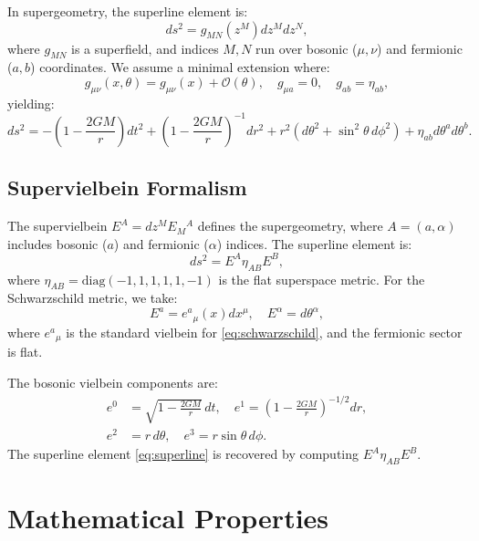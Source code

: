 \documentclass[12pt]{article}
\theoremstyle{plain}
\newcommand{\supercoords}{z^{M}}
\newcommand{\superline}{ds^{2}}
\newcommand{\schwarzschild}{g_{\mu\nu}}
\newcommand{\supervielbein}{E^{A}}
\begin{document}
In supergeometry, the superline element is:
\begin{equation}
\superline = g_{MN}(\supercoords) dz^{M} dz^{N},
\end{equation}
where $g_{MN}$ is a superfield, and indices $M, N$ run over bosonic ($\mu, \nu$) and fermionic ($a, b$) coordinates. We assume a minimal extension where:
\begin{equation}
g_{\mu\nu}(x, \theta) = \schwarzschild(x) + \mathcal{O}(\theta), \quad g_{\mu a} = 0, \quad g_{ab} = \eta_{ab},
\end{equation}
yielding:
\begin{equation}
\superline = -\left(1 - \frac{2GM}{r}\right) dt^{2} + \left(1 - \frac{2GM}{r}\right)^{-1} dr^{2} + r^{2} (d\theta^{2} + \sin^{2}\theta \, d\phi^{2}) + \eta_{ab} d\theta^{a} d\theta^{b}.
\label{eq:superline}
\end{equation}

\subsection{Supervielbein Formalism}

The supervielbein $\supervielbein = dz^{M} E_{M}{}^{A}$ defines the supergeometry, where $A = (a, \alpha)$ includes bosonic ($a$) and fermionic ($\alpha$) indices. The superline element is:
\begin{equation}
\superline = \supervielbein \eta_{AB} E^{B},
\end{equation}
where $\eta_{AB} = \mathrm{diag}(-1, 1, 1, 1, 1, -1)$ is the flat superspace metric. For the Schwarzschild metric, we take:
\begin{equation}
E^{a} = e^{a}{}_{\mu}(x) dx^{\mu}, \quad E^{\alpha} = d\theta^{\alpha},
\end{equation}
where $e^{a}{}_{\mu}$ is the standard vielbein for \eqref{eq:schwarzschild}, and the fermionic sector is flat.

The bosonic vielbein components are:
\begin{align}
e^{0} &= \sqrt{1 - \frac{2GM}{r}} \, dt, \quad e^{1} = \left(1 - \frac{2GM}{r}\right)^{-1/2} dr, \\
e^{2} &= r \, d\theta, \quad e^{3} = r \sin\theta \, d\phi.
\end{align}
The superline element \eqref{eq:superline} is recovered by computing $\supervielbein \eta_{AB} E^{B}$.

\section{Mathematical Properties}
\end{document}
